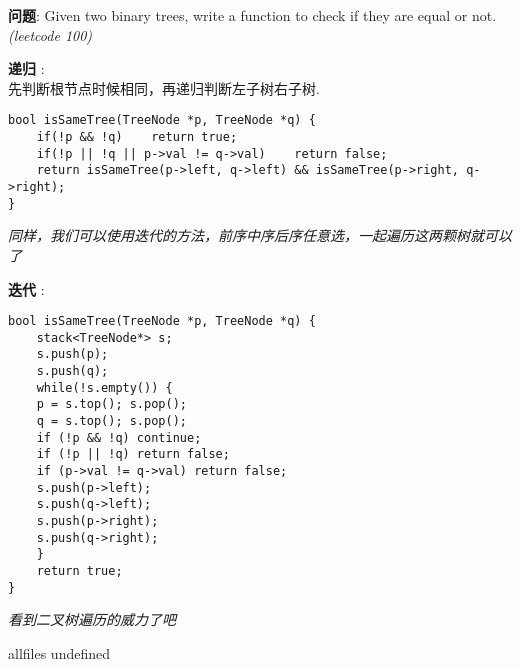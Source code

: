 \documentclass{article}
\begin{document}
\begin{CJK}{UTF8}{gbsn}     %

\else
	
\begin{description}
	\item{\textbf{问题}}: Given two binary trees, write a function to check if they are equal or not. \textit{(leetcode 100)}
	\item{\textbf{递归}} : 
	\\先判断根节点时候相同，再递归判断左子树右子树.
	\begin{lstlisting}
bool isSameTree(TreeNode *p, TreeNode *q) {
	if(!p && !q)	return true;
	if(!p || !q || p->val != q->val)	return false;
	return isSameTree(p->left, q->left) && isSameTree(p->right, q->right);
}
	\end{lstlisting}
	\textit{同样，我们可以使用迭代的方法，前序中序后序任意选，一起遍历这两颗树就可以了}
	\item{\textbf{迭代}} : 
	\begin{lstlisting}
bool isSameTree(TreeNode *p, TreeNode *q) {
	stack<TreeNode*> s;
	s.push(p);
	s.push(q);
	while(!s.empty()) {
	p = s.top(); s.pop();
	q = s.top(); s.pop();
	if (!p && !q) continue;
	if (!p || !q) return false;
	if (p->val != q->val) return false;
	s.push(p->left);
	s.push(q->left);
	s.push(p->right);
	s.push(q->right);
	}
	return true;
}
	\end{lstlisting}
	\textit{看到二叉树遍历的威力了吧}
\end{description}

\fi

\ifx allfiles undefined
\end{CJK}
\end{document}
